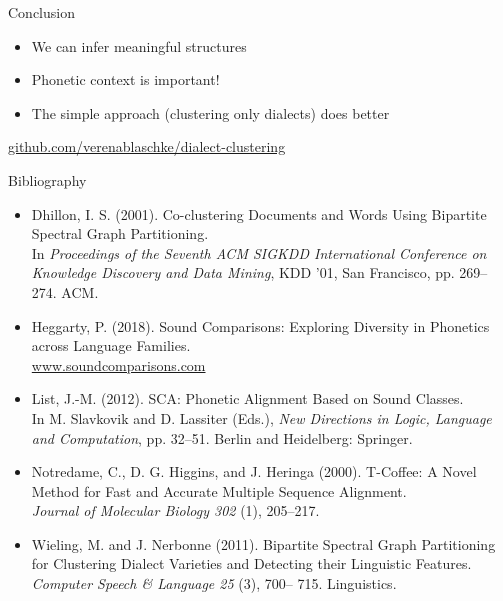 \documentclass[xcolor={dvipsnames}]{beamer}
\begin{document}
\begin{frame}{Conclusion}
\begin{itemize}
    \item We can infer meaningful structures
    \item Phonetic context is important!
    \item The simple approach (clustering only dialects) does better
\end{itemize}

\vspace{2em}
\url{github.com/verenablaschke/dialect-clustering}
\end{frame}

\appendix
\begin{frame}[allowframebreaks]{Bibliography}
\begin{itemize}
    \item 
Dhillon, I. S. (2001). Co-clustering Documents and Words Using Bipartite Spectral Graph Partitioning.\\
In \textit{Proceedings of the Seventh ACM SIGKDD International Conference on Knowledge
Discovery and Data Mining}, KDD ’01, San Francisco, pp. 269–274. ACM.

\item
Heggarty, P. (2018). Sound Comparisons: Exploring Diversity in Phonetics across Language
Families.\\ \url{www.soundcomparisons.com}

\item
List, J.-M. (2012). SCA: Phonetic Alignment Based on Sound Classes.\\In M. Slavkovik and
D. Lassiter (Eds.), \textit{New Directions in Logic, Language and Computation}, pp. 32–51. Berlin and Heidelberg: Springer.

\item
Notredame, C., D. G. Higgins, and J. Heringa (2000). T-Coffee: A Novel Method
for Fast and Accurate Multiple Sequence Alignment.\\\textit{Journal of Molecular
Biology 302} (1), 205–217.

\item
Wieling, M. and J. Nerbonne (2011). Bipartite Spectral Graph Partitioning for Clustering Dialect
Varieties and Detecting their Linguistic Features.\\\textit{Computer Speech \& Language 25} (3), 700–
715.
Linguistics.
\end{itemize}
\end{frame}
\end{document}
